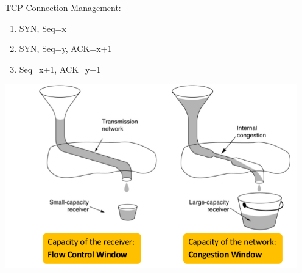 \documentclass[11pt,ngerman]{article}
\begin{document}
TCP	Connection	Management:	
\begin{enumerate}
\item SYN, Seq=x
\item SYN, Seq=y, ACK=x+1
\item Seq=x+1, ACK=y+1
\end{enumerate}
\includegraphics[width=5in]{images/Selection_022.png}\\
\end{document}
